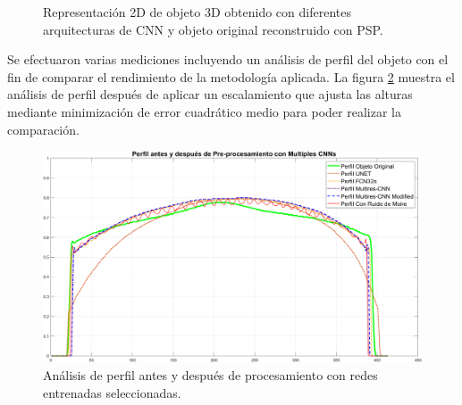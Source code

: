 \documentclass[10pt,letterpaper]{article}
\begin{document}
\begin{figure}[H]
\begin{center}
{            \label{tif115}}
        \caption{Representación 2D de objeto 3D obtenido con diferentes arquitecturas de CNN y objeto original reconstruido con PSP.}
        \label{tif112113114115116117}
      \end{center}
\end{figure}

Se efectuaron varias mediciones incluyendo un análisis de perfil del objeto con el fin de comparar el rendimiento de la metodología aplicada. La figura \ref{tif97} muestra el análisis de perfil después de aplicar un escalamiento que ajusta las alturas mediante minimización de error cuadrático medio \cite{Alfa:Mont} para poder realizar la comparación. %

\begin{figure}[H]
	\centering
    \includegraphics[width=1\textwidth]{tifs/tif97.png}
    \caption{Análisis de perfil antes y después de procesamiento con redes entrenadas seleccionadas.}
    \label{tif97}
\end{figure}
\end{document}

